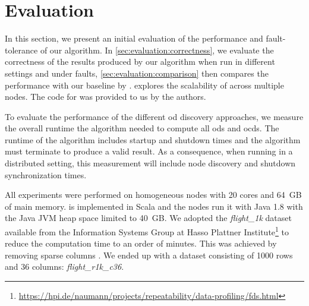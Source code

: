 
\section{Evaluation}\label{sec:evaluation}

  In this section, we present an initial evaluation of the performance and fault-tolerance of our algorithm.
  In \cref{sec:evaluation:correctness}, we evaluate the correctness of the results produced by our algorithm when run in different settings and under faults, \cref{sec:evaluation:comparison} then compares the performance with our baseline \ocddiscover{} by \citeauthor{consonni}.
   explores the scalability of \dodo{} across multiple nodes.
  The code for \ocddiscover{} was provided to us by the authors.

  To evaluate the performance of the different \gls{od} discovery approaches, we measure the overall runtime the algorithm needed to compute all \glspl{od} and \glspl{ocd}.
  The runtime of the algorithm includes startup and shutdown times and the algorithm must terminate to produce a valid result.
  As a consequence, when running \dodo{} in a distributed setting, this measurement will include node discovery and shutdown synchronization times.

  All experiments were performed on homogeneous nodes with 20 cores and 64~GB of main memory.
  \dodo{} is implemented in Scala and the nodes run it with Java 1.8 with the Java JVM heap space limited to 40~GB.
  We adopted the \textit{flight\_1k} dataset available from the Information Systems Group at Hasso Plattner Institute\footnote{\url{https://hpi.de/naumann/projects/repeatability/data-profiling/fds.html}} to reduce the computation time to an order of minutes.
  This was achieved by removing sparse columns%
  .
  We ended up with a dataset consisting of 1000 rows and 36 columns: \textit{flight\_r1k\_c36}.

